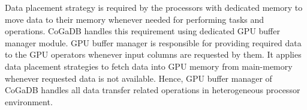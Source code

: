 Data placement strategy is required by the processors with dedicated memory to move data to their memory whenever needed for performing tasks and operations. CoGaDB handles this requirement using dedicated GPU buffer manager module. GPU buffer manager\cite{cogadb_design_impl} is responsible for providing required data to the GPU operators whenever input columns are requested by them. It applies data placement strategies to fetch data into GPU memory from main-memory whenever requested data is not available. Hence, GPU buffer manager of CoGaDB handles all data transfer related operations in heterogeneous processor environment.